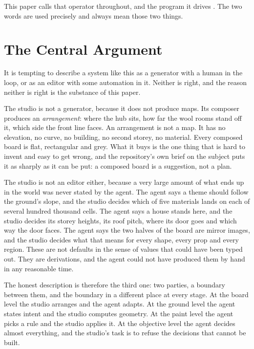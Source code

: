 This paper calls that operator  throughout, and the program it
drives . The two words are used precisely and always mean those
two things.

\section{The Central Argument}

It is tempting to describe a system like this as a generator with a human in the
loop, or as an editor with some automation in it. Neither is right, and the reason
neither is right is the substance of this paper.

The studio is not a generator, because it does not produce maps. Its composer
produces an \emph{arrangement}: where the hub sits, how far the wool rooms stand
off it, which side the front line faces. An arrangement is not a map. It has no
elevation, no curve, no building, no second storey, no material. Every composed
board is flat, rectangular and grey. What it buys is the one thing that is hard to
invent and easy to get wrong, and the repository's own brief on the subject puts it
as sharply as it can be put: a composed board is a suggestion, not a plan.

The studio is not an editor either, because a very large amount of what ends up in
the world was never stated by the agent. The agent says a theme should follow the
ground's slope, and the studio decides which of five materials lands on each of
several hundred thousand cells. The agent says a house stands here, and the studio
decides its storey heights, its roof pitch, where its door goes and which way the
door faces. The agent says the two halves of the board are mirror images, and the
studio decides what that means for every shape, every prop and every region. These
are not defaults in the sense of values that could have been typed out. They are
derivations, and the agent could not have produced them by hand in any reasonable
time.

The honest description is therefore the third one: two parties, a boundary between
them, and the boundary in a different place at every stage. At the board level the
studio arranges and the agent adapts. At the ground level the agent states intent
and the studio computes geometry. At the paint level the agent picks a rule and the
studio applies it. At the objective level the agent decides almost everything, and
the studio's task is to refuse the decisions that cannot be built.

